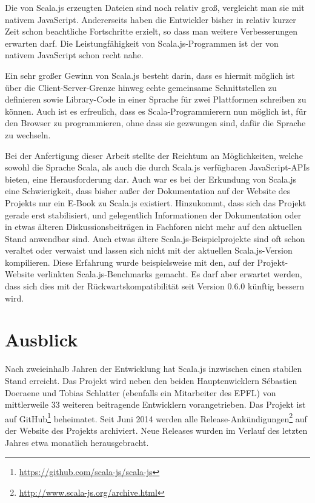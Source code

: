 \documentclass[a4paper, 12pt, hidelinks, listof=totoc, listoftables=totoc, bibliography=totoc]{scrreprt}
\begin{document}
Die von Scala.js erzeugten Dateien sind noch relativ groß, vergleicht man sie mit nativem JavaScript. Andererseits haben die Entwickler bisher in relativ kurzer Zeit schon beachtliche Fortschritte erzielt, so dass man weitere Verbesserungen erwarten darf. Die Leistungfähigkeit von Scala.js-Programmen ist der von nativem JavaScript schon recht nahe.

Ein sehr großer Gewinn von Scala.js besteht darin, dass es hiermit möglich ist über die Client-Server-Grenze hinweg echte gemeinsame Schnittstellen zu definieren sowie Library-Code in einer Sprache für zwei Plattformen schreiben zu können. Auch ist es erfreulich, dass es Scala-Programmierern nun möglich ist, für den Browser zu programmieren, ohne dass sie gezwungen sind, dafür die Sprache zu wechseln.

Bei der Anfertigung dieser Arbeit stellte der Reichtum an Möglichkeiten, welche sowohl die Sprache Scala, als auch die durch Scala.js verfügbaren JavaScript-\ac{API}s bieten, eine Herausforderung dar. Auch war es bei der Erkundung von Scala.js eine Schwierigkeit, dass bisher außer der Dokumentation auf der Website des Projekts nur ein E-Book zu Scala.js existiert. Hinzukommt, dass sich das Projekt gerade erst stabilisiert, und gelegentlich Informationen der Dokumentation oder in etwas älteren Diskussionsbeiträgen in Fachforen nicht mehr auf den aktuellen Stand anwendbar sind. Auch etwas ältere Scala.js-Beispielprojekte sind oft schon veraltet oder verwaist und lassen sich nicht mit der aktuellen Scala.js-Version kompilieren. Diese Erfahrung wurde beispielsweise mit den, auf der Projekt-Website verlinkten Scala.js-Benchmarks gemacht. Es darf aber erwartet werden, dass sich dies mit der Rückwartskompatibilität seit Version 0.6.0 künftig bessern wird.


\section{Ausblick}

Nach zweieinhalb Jahren der Entwicklung hat Scala.js inzwischen einen stabilen Stand erreicht. Das Projekt wird neben den beiden Hauptenwicklern Sébastien Doeraene und Tobias Schlatter (ebenfalls ein Mitarbeiter des \ac{EPFL}) von mittlerweile 33 weiteren beitragende Entwicklern vorangetrieben. Das Projekt ist auf GitHub\footnote{\url{https://github.com/scala-js/scala-js}} beheimatet. Seit Juni 2014 werden alle Release-Ankündigungen\footnote{\url{http://www.scala-js.org/archive.html}} auf der Website des Projekts archiviert. Neue Releases wurden im Verlauf des letzten Jahres etwa monatlich herausgebracht.
\end{document}
